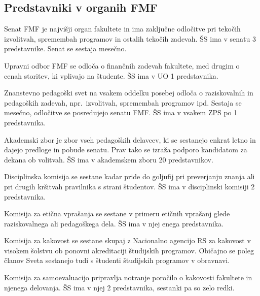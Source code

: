 \documentclass[a4paper,oneside,12pt]{article}
\theoremstyle{definition}
\newenvironment{description*}{\vspace{-6pt}\begin{description}\setlength{\itemsep}{0pt}\setlength{\parskip}{2pt}}{\end{description}\vspace{-1\parskip}}
\begin{document}
\subsection*{Predstavniki v organih FMF}
\begin{description*}
  \item[Senat FMF] je najvišji organ fakultete in ima zaključne odločitve pri tekočih izvolitvah,
    spremembah programov in ostalih tekočih zadevah. ŠS ima v senatu 3 predstavnike. Senat se
    sestaja mesečno.
  \item[Upravni odbor FMF] se odloča o finančnih zadevah fakultete, med drugim o cenah storitev, ki
    vplivajo na študente. ŠS ima v UO 1 predstavnika.
  \item[Znanstevno pedagoški svet] na vsakem oddelku posebej odloča o raziskovalnih in pedagoških
    zadevah, npr.~izvolitvah, spremembah programov ipd. Sestaja se mesečno, odločitve se posredujejo
    senatu FMF.  ŠS ima v vsakem ZPS po 1 predstavnika.
  \item[Akademski zbor] je zbor vseh pedagoških delavcev, ki se sestanejo enkrat letno in dajejo
    predloge in pobude senatu. Prav tako se izraža podporo kandidatom za dekana ob volitvah. ŠS ima
    v akademskem zboru 20 predstavnikov.
  \item[Disciplinska komisija] se sestane kadar pride do goljufij pri preverjanju znanja ali pri
    drugih kršitvah pravilnika s strani študentov. ŠS ima v disciplinski komisiji 2 predstavnika.
  \item[Komisija za etična vprašanja] se sestane v primeru etičnih vprašanj glede raziskovalnega ali
    pedagoškega dela. ŠS ima v njej enega predstavnika.
  \item[Komisija za kakovost] se sestane skupaj z Nacionalno agencijo RS za kakovost v visokem
    šolstvu ob ponovni akreditaciji študijskih programov. Običajno se poleg članov Sveta sestanejo
    tudi s študenti študijskih programov v obravnavi.
  \item[Komisija za samoevaluacijo] pripravlja notranje poročilo o kakovosti fakultete in njenega
    delovanja. ŠS ima v njej 2 predstavnika, sestanki pa so zelo redki.
\end{description*}
\end{document}
